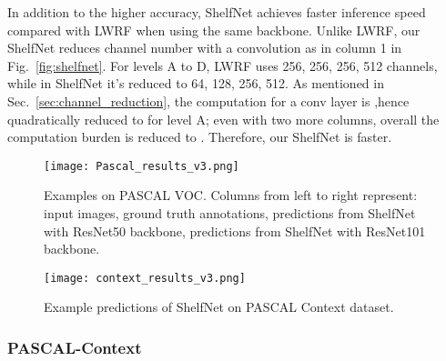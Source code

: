 \documentclass[10pt,twocolumn,letterpaper]{article}
\begin{document}
In addition to the higher accuracy, ShelfNet achieves faster inference speed compared with LWRF when using the same backbone. Unlike LWRF, our ShelfNet reduces channel number with a  convolution as in column 1 in Fig.~\ref{fig:shelfnet}. For levels A to D, LWRF uses 256, 256, 256, 512 channels, while in ShelfNet it's reduced to 64, 128, 256, 512. As mentioned in Sec.~\ref{sec:channel_reduction}, the computation for a conv layer is ,hence quadratically reduced to  for level A; even with two more columns, overall the computation burden is reduced to . Therefore, our ShelfNet is faster.



\begin{figure}[htb!]
    \centering
        \texttt{[image: Pascal\_results\_v3.png]}
        \caption{Examples on PASCAL VOC. Columns from left to right represent: input images, ground truth annotations, predictions from ShelfNet with ResNet50 backbone, predictions from ShelfNet with ResNet101 backbone.}
    \label{fig:pascal_result}
\end{figure} 

\begin{figure}[htb!]
    \centering
        \texttt{[image: context\_results\_v3.png]}
        \caption{Example predictions of ShelfNet on PASCAL Context  dataset.}
    \label{context_result}
    \label{context_figure}
\end{figure} 
\vspace{-0.1cm}

\subsubsection{PASCAL-Context}
\label{pcontext_section}
\end{document}
